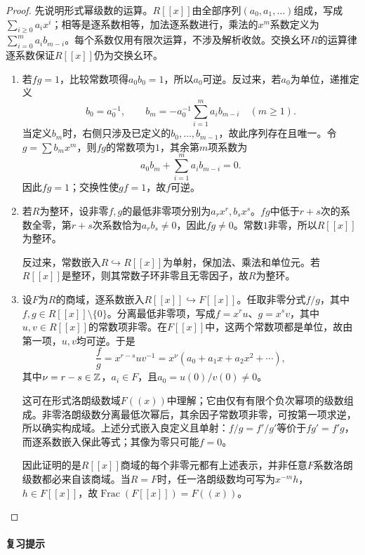 \begin{proof}

先说明形式幂级数的运算。$R[[x]]$由全部序列$(a_0,a_1,\ldots)$组成，写成$\sum_{i\ge0}a_ix^i$；相等是逐系数相等，加法逐系数进行，乘法的$x^m$系数定义为$\sum_{i=0}^m a_ib_{m-i}$。每个系数仅用有限次运算，不涉及解析收敛。交换幺环$R$的运算律逐系数保证$R[[x]]$仍为交换幺环。

\begin{enumerate}
\item 若$fg=1$，比较常数项得$a_0b_0=1$，所以$a_0$可逆。反过来，若$a_0$为单位，递推定义
\[
b_0=a_0^{-1},\qquad
b_m=-a_0^{-1}\sum_{i=1}^m a_i b_{m-i}\quad(m\ge1).
\]
当定义$b_m$时，右侧只涉及已定义的$b_0,\ldots,b_{m-1}$，故此序列存在且唯一。令$g=\sum b_mx^m$，则$fg$的常数项为$1$，其余第$m$项系数为
\[
a_0b_m+\sum_{i=1}^m a_i b_{m-i}=0.
\]
因此$fg=1$；交换性使$gf=1$，故$f$可逆。
\item 若$R$为整环，设非零$f,g$的最低非零项分别为$a_rx^r,b_sx^s$。$fg$中低于$r+s$次的系数全零，第$r+s$次系数恰为$a_rb_s\ne0$，因此$fg\ne0$。常数$1$非零，所以$R[[x]]$为整环。

反过来，常数嵌入$R\hookrightarrow R[[x]]$为单射，保加法、乘法和单位元。若$R[[x]]$是整环，则其常数子环非零且无零因子，故$R$为整环。
\item 设$F$为$R$的商域，逐系数嵌入$R[[x]]\hookrightarrow F[[x]]$。任取非零分式$f/g$，其中$f,g\in R[[x]]\setminus\{0\}$。分离最低非零项，写成$f=x^r u$、$g=x^s v$，其中$u,v\in R[[x]]$的常数项非零。在$F[[x]]$中，这两个常数项都是单位，故由第一项，$u,v$均可逆。于是
\[
\frac fg=x^{r-s}uv^{-1}=x^\nu(a_0+a_1x+a_2x^2+\cdots),
\]
其中$\nu=r-s\in\mathbb Z$，$a_i\in F$，且$a_0=u(0)/v(0)\ne0$。

这可在形式洛朗级数域$F((x))$中理解；它由仅有有限个负次幂项的级数组成。非零洛朗级数分离最低次幂后，其余因子常数项非零，可按第一项求逆，所以确实构成域。上述分式嵌入良定义且单射：$f/g=f'/g'$等价于$fg'=f'g$，而逐系数嵌入保此等式；其像为零只可能$f=0$。

因此证明的是$R[[x]]$商域的每个非零元都有上述表示，并非任意$F$系数洛朗级数都必来自该商域。当$R=F$时，任一洛朗级数均可写为$x^{-m}h$，$h\in F[[x]]$，故$\operatorname{Frac}(F[[x]])=F((x))$。
\end{enumerate}

\end{proof}

\paragraph{复习提示}

